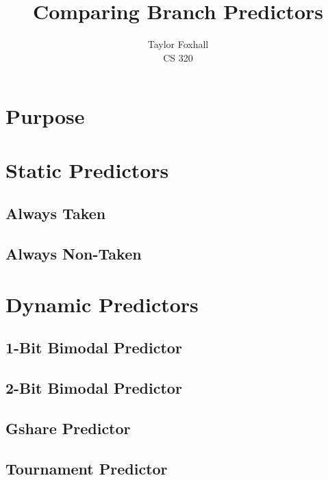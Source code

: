 \message{ !name(report.tex)}\documentclass[12pt]{article}
\begin{document}

 
\title{Comparing Branch Predictors}
\author{Taylor Foxhall\\
CS 320}
 
\maketitle

\section{Purpose}
\label{sec:label}

 
\section{Static Predictors}
\label{sec:label}

\subsection{Always Taken}
\label{subsec:label}

\subsection{Always Non-Taken}
\label{sec:label}

\section{Dynamic Predictors}
\label{sec:label}

\subsection{1-Bit Bimodal Predictor}
\label{subsec:label}

\subsection{2-Bit Bimodal Predictor}
\label{subsec:label}

\subsection{Gshare Predictor}
\label{subsec:label}

\subsection{Tournament Predictor}
\label{subsec:label}
 
\end{document}
